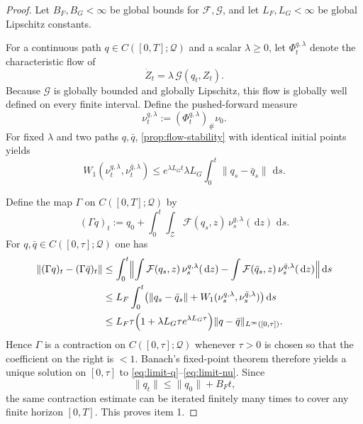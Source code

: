 \documentclass{article}
\theoremstyle{definition}
\newcommand{\W}{W_1}
\newcommand{\dd}{\,\mathrm{d}}
\begin{document}
\begin{proof}
Let $B_F,B_G<\infty$ be global bounds for $\mathcal F,\mathcal G$, and let $L_F,L_G<\infty$ be global Lipschitz constants.

For a continuous path $q\in C([0,T];\mathcal Q)$ and a scalar $\lambda\ge 0$, let $\Phi_t^{q,\lambda}$ denote the characteristic flow of
\[
  \dot Z_t=\lambda\,\mathcal G(q_t,Z_t).
\]
Because $\mathcal G$ is globally bounded and globally Lipschitz, this flow is globally well defined on every finite interval. Define the pushed-forward measure
\[
  \nu_t^{q,\lambda}:=(\Phi_t^{q,\lambda})_\#\nu_0.
\]
For fixed $\lambda$ and two paths $q,\bar q$, \cref{prop:flow-stability} with identical initial points yields
\begin{equation}
  \W(\nu_t^{q,\lambda},\nu_t^{\bar q,\lambda})
  \le
  e^{\lambda L_G t}\lambda L_G\int_0^t \|q_s-\bar q_s\|\,\dd s.
  \label{eq:abstract-flow-q-diff}
\end{equation}

Define the map $\Gamma$ on $C([0,T];\mathcal Q)$ by
\[
  (\Gamma q)_t
  :=
  q_0 + \int_0^t \int_{\mathcal Z}\mathcal F(q_s,z)\,\nu_s^{q,\lambda}(\dd z)\,\dd s.
\]
For $q,\bar q\in C([0,\tau];\mathcal Q)$ one has
\begin{align*}
  \|(\Gamma q)_t-(\Gamma\bar q)_t\|
  &\le
  \int_0^t
  \Bigl\|
    \int \mathcal F(q_s,z)\,\nu_s^{q,\lambda}(\dd z)
    -
    \int \mathcal F(\bar q_s,z)\,\nu_s^{\bar q,\lambda}(\dd z)
  \Bigr\|
  \dd s
  \\
  &\le
  L_F\int_0^t
  \bigl(
    \|q_s-\bar q_s\|
    +
    \W(\nu_s^{q,\lambda},\nu_s^{\bar q,\lambda})
  \bigr)\dd s
  \\
  &\le
  L_F\tau
  \Bigl(
    1+\lambda L_G \tau e^{\lambda L_G\tau}
  \Bigr)
  \|q-\bar q\|_{L^\infty([0,\tau])}.
\end{align*}
Hence $\Gamma$ is a contraction on $C([0,\tau];\mathcal Q)$ whenever $\tau>0$ is chosen so that the coefficient on the right is $<1$. Banach's fixed-point theorem therefore yields a unique solution on $[0,\tau]$ to \eqref{eq:limit-q}--\eqref{eq:limit-nu}. Since
\[
  \|q_t\|\le \|q_0\|+B_F t,
\]
the same contraction estimate can be iterated finitely many times to cover any finite horizon $[0,T]$. This proves item 1.


\end{proof}
\end{document}
